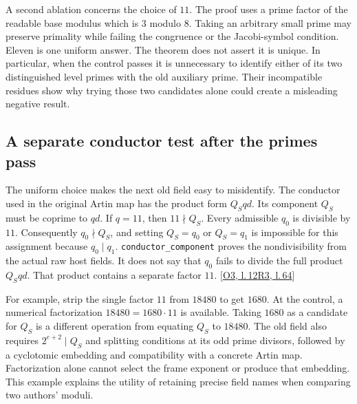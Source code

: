 \documentclass[12pt,letterpaper]{article}
\newcommand{\id}[1]{{\small\nolinkurl{#1}}}
\begin{document}
A second ablation concerns the choice of $11$. The proof uses a prime factor of the readable base modulus which is $3$ modulo $8$. Taking an arbitrary small prime may preserve primality while failing the congruence or the Jacobi-symbol condition. Eleven is one uniform answer. The theorem does not assert it is unique. In particular, when the control passes it is unnecessary to identify either of its two distinguished level primes with the old auxiliary prime. Their incompatible residues show why trying those two candidates alone could create a misleading negative result.

\subsection{A separate conductor test after the primes pass}
The uniform choice makes the next old field easy to misidentify. The conductor used in the original Artin map has the product form $Q_S q d$. Its component $Q_S$ must be coprime to $qd$. If $q=11$, then $11\nmid Q_S$. Every admissible $q_0$ is divisible by $11$. Consequently $q_0\nmid Q_S$, and setting $Q_S=q_0$ or $Q_S=q_1$ is impossible for this assignment because $q_0\mid q_1$. \id{conductor_component} proves the nondivisibility from the actual raw host fields. It does not say that $q_0$ fails to divide the full product $Q_Sqd$. That product contains a separate factor $11$.  {\footnotesize\sffamily\color{mute}[\href{https://github.com/nousentllc/riemann-hypothesis/blob/40e56bab026552e089d7afcfeff08d2defb9c005/src/Formalism/SharpRestriction/RamificationFrobenius/TotientGaloisClasses/ConjEMemHostFIff.lean\#L12}{O3, l.\,12}\enspace \href{https://github.com/leanprover-community/riemann-hypothesis/blob/e063a923620ee7787b4a1270421478645bf66bdb/src/New/Reduction/Data/FieldsAndPlaces.lean\#L64}{R3, l.\,64}]}

For example, strip the single factor $11$ from $18480$ to get $1680$. At the control, a numerical factorization $18480=1680\cdot11$ is available. Taking $1680$ as a candidate for $Q_S$ is a different operation from equating $Q_S$ to $18480$. The old field also requires $2^{e+2}\mid Q_S$ and splitting conditions at its odd prime divisors, followed by a cyclotomic embedding and compatibility with a concrete Artin map. Factorization alone cannot select the frame exponent or produce that embedding. This example explains the utility of retaining precise field names when comparing two authors' moduli.
\end{document}
